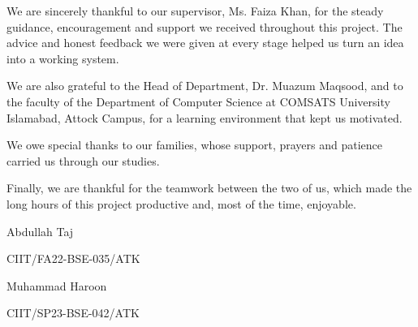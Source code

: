 \documentclass[A4paper,12pt]{report}
\theoremstyle{plain}
\theoremstyle{definition}
\theoremstyle{remark}
\numberwithin{equation}{section}
\begin{document}

\justify \noindent \normalsize{We are sincerely thankful to our supervisor, Ms. Faiza Khan, for the steady guidance, encouragement and support we received throughout this project. The advice and honest feedback we were given at every stage helped us turn an idea into a working system.

\noindent We are also grateful to the Head of Department, Dr. Muazum Maqsood, and to the faculty of the Department of Computer Science at COMSATS University Islamabad, Attock Campus, for a learning environment that kept us motivated.

\noindent We owe special thanks to our families, whose support, prayers and patience carried us through our studies.

\noindent Finally, we are thankful for the teamwork between the two of us, which made the long hours of this project productive and, most of the time, enjoyable.

}

\begin{flushright}
\vspace{0.5in}
\hspace{265pt}Abdullah Taj

\hspace{240pt}CIIT/FA22-BSE-035/ATK


\vspace{0.5in}
\hspace{265pt}Muhammad Haroon

\hspace{240pt}CIIT/SP23-BSE-042/ATK
\end{flushright}
\end{document}
